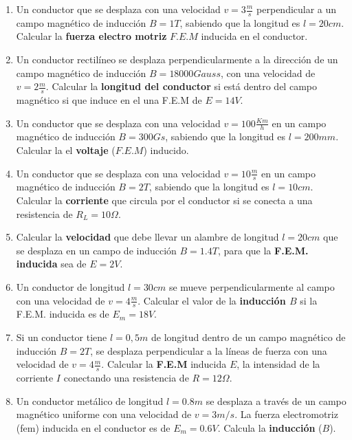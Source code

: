 \documentclass[../main]{subfiles}
\begin{document}
\begin{enumerate}
    \item Un conductor que se desplaza con una velocidad $v=3\frac{m}{s}$ perpendicular a un campo magnético de inducción $B=1T$, sabiendo que la longitud es $l=20cm$. Calcular la \textbf{fuerza electro motriz} $F.E.M$ inducida en el conductor.

    \item Un conductor rectilíneo se desplaza perpendicularmente a la dirección de un campo magnético de inducción $B=18000Gauss$, con una velocidad de $v=2\frac{m}{s}$. Calcular la \textbf{longitud del conductor} si está dentro del campo magnético si que induce en el una F.E.M de $E=14V$.
    
    \item Un conductor que se desplaza con una velocidad $v=100\frac{Km}{h}$  en un campo magnético de inducción $B=300Gs$, sabiendo que la longitud es $l=200mm$. Calcular la el \textbf{voltaje} ($F.E.M$) inducido.

    \item Un conductor que se desplaza con una velocidad $v=10\frac{m}{s}$  en un campo magnético de inducción $B=2T$, sabiendo que la longitud es $l=10cm$. Calcular la \textbf{corriente} que circula por el conductor si se conecta a una resistencia de $R_L=10\Omega$.

    
    \item Calcular la \textbf{velocidad} que debe llevar un alambre de longitud $l=20cm$ que se desplaza en un campo de inducción $B=1.4T$, para que la \textbf{F.E.M. inducida} sea de $E=2V$.

    \item Un conductor de longitud $l=30cm$ se mueve perpendicularmente al campo con una velocidad de $v=4\frac{m}{s}$. Calcular el valor de la \textbf{inducción $B$} si la F.E.M. inducida es de $E_m=18V$.
    
    \item Si un conductor tiene $l=0,5m$ de longitud dentro de un campo magnético de inducción $B=2T$, se desplaza perpendicular a la líneas de fuerza con una velocidad de $v=4\frac{m}{s}$. Calcular la \textbf{F.E.M} inducida $E$, la intensidad de la corriente $I$ conectando una resistencia de $R=12\Omega$.
    
    \item Un conductor metálico de longitud $l=0.8 m$ se desplaza a través de un campo magnético uniforme con una velocidad de $v=3 m/s$. La fuerza electromotriz (fem) inducida en el conductor es de $E_m=0.6 V$. Calcula la \textbf{inducción} ($B$).


\end{enumerate}
\end{document}
